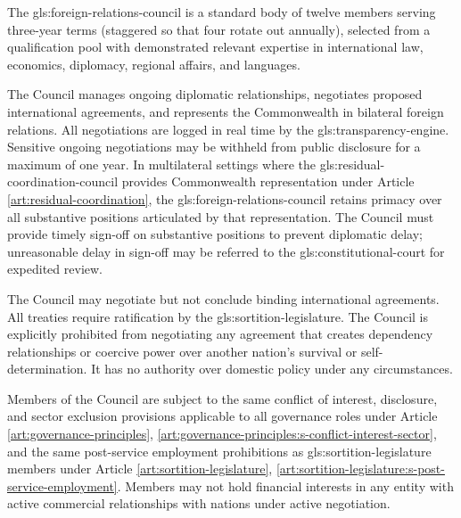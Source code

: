 


The \gls{gls:foreign-relations-council} is a standard body of twelve members serving three-year terms (staggered so that four rotate out annually), selected from a qualification pool with demonstrated relevant expertise in international law, economics, diplomacy, regional affairs, and languages.

The Council manages ongoing diplomatic relationships, negotiates proposed international agreements, and represents the Commonwealth in bilateral foreign relations. All negotiations are logged in real time by the \gls{gls:transparency-engine}. Sensitive ongoing negotiations may be withheld from public disclosure for a maximum of one year. In multilateral settings where the \gls{gls:residual-coordination-council} provides Commonwealth representation under Article \ref{art:residual-coordination}, the \gls{gls:foreign-relations-council} retains primacy over all substantive positions articulated by that representation. The Council must provide timely sign-off on substantive positions to prevent diplomatic delay; unreasonable delay in sign-off may be referred to the \gls{gls:constitutional-court} for expedited review.

The Council may negotiate but not conclude binding international agreements. All treaties require ratification by the \gls{gls:sortition-legislature}. The Council is explicitly prohibited from negotiating any agreement that creates dependency relationships or coercive power over another nation's survival or self-determination. It has no authority over domestic policy under any circumstances.

Members of the Council are subject to the same conflict of interest, disclosure, and sector exclusion provisions applicable to all governance roles under Article \ref{art:governance-principles}, \ref{art:governance-principles:s-conflict-interest-sector}, and the same post-service employment prohibitions as \gls{gls:sortition-legislature} members under Article \ref{art:sortition-legislature}, \ref{art:sortition-legislature:s-post-service-employment}. Members may not hold financial interests in any entity with active commercial relationships with nations under active negotiation.

